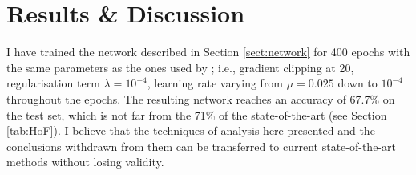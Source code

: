 \chapter{Results \& Discussion} \label{Chapter: Results}





I have trained the network described in Section \ref{sect:network} for 400 epochs with the same parameters as the ones used by \cite{Jurtz2017}; i.e., gradient clipping at 20, regularisation term $\lambda=10^{-4}$, learning rate varying from $\mu=0.025$ down to $10^{-4}$ throughout the epochs. The resulting network reaches an accuracy of 67.7\% on the test set, which is not far from the 71\% of the state-of-the-art (see Section \ref{tab:HoF}).
I believe that the techniques of analysis here presented and the conclusions withdrawn from them can be transferred to current state-of-the-art methods without losing validity.

